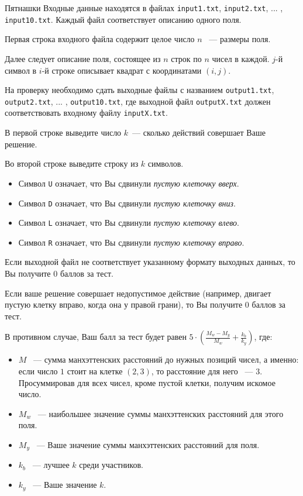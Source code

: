 \begin{problem}{Пятнашки}{}{}{}{}
\InputFile
Входные данные находятся в файлах \texttt{input1.txt}, \texttt{input2.txt}, ... , \texttt{input10.txt}. Каждый файл соответствует описанию одного поля.

Первая строка входного файла содержит целое число $n$ ~--- размеры поля.

Далее следует описание поля, состоящее из $n$ строк по $n$ чисел в каждой. $j$-й символ в $i$-й строке описывает квадрат с координатами $(i,j)$.

\OutputFile
На проверку необходимо сдать выходные файлы с названием \texttt{output1.txt}, \texttt{output2.txt}, ... , \texttt{output10.txt}, где выходной файл \texttt{outputX.txt} должен соответствовать входному файлу \texttt{inputX.txt}.

В первой строке выведите число $k$~--- сколько действий совершает Ваше решение.

Во второй строке выведите строку из $k$ символов.
\begin{itemize}
\item Символ \texttt{U} означает, что Вы сдвинули \textit{пустую клеточку вверх}.
\item Символ \texttt{D} означает, что Вы сдвинули \textit{пустую клеточку вниз}.
\item Символ \texttt{L} означает, что Вы сдвинули \textit{пустую клеточку влево}.
\item Символ \texttt{R} означает, что Вы сдвинули \textit{пустую клеточку вправо}.
\end{itemize}

\Scoring
Если выходной файл не соответствует указанному формату выходных данных, то Вы получите $0$ баллов за тест.

Если ваше решение совершает недопустимое действие (например, двигает пустую клетку вправо, когда она у правой грани), то Вы получите $0$ баллов за тест.


В противном случае, Ваш балл за тест будет равен $5\cdot\left(\frac{M_{w}-M_{y}}{M_{w}}+\frac{k_{b}}{k_{y}}\right)$, где:
\begin{itemize}
\item $M$ ~--- сумма манхэттенских расстояний до нужных позиций чисел, а именно: если число $1$ стоит на клетке $(2,3)$, то расстояние для него ~--- $3$. Просуммировав для всех чисел, кроме пустой клетки, получим искомое число.
\item $M_{w}$ ~--- наибольшее значение суммы манхэттенских расстояний для этого поля.
\item $M_{y}$ ~--- Ваше значение суммы манхэттенских расстояний для поля.
\item $k_{b}$ ~--- лучшее $k$ среди участников.
\item $k_{y}$ ~--- Ваше значение $k$.
\end{itemize}


\end{problem}
